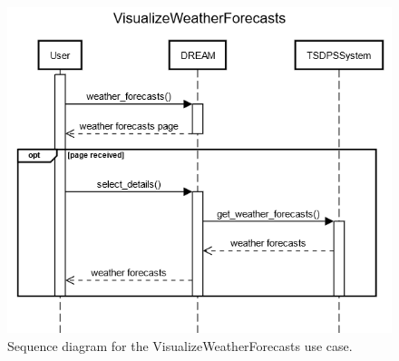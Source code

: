 \documentclass{article}
\begin{document}
\begin{figure}[H]
    \centering
	\includegraphics[scale=0.5]{sequence_diagrams/VisualizeWeatherForecasts.png}
    \caption{Sequence diagram for the VisualizeWeatherForecasts use case.}
\end{figure}
\newpage

\end{document}
